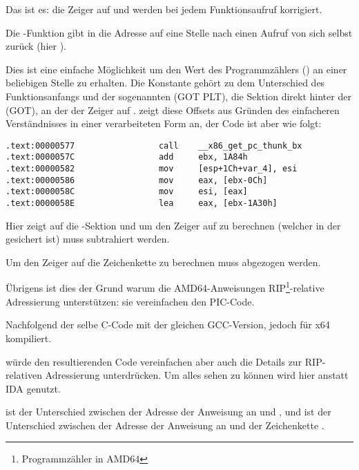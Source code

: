 Das ist es: die Zeiger auf \retstring{} und \globvar{} werden bei jedem Funktionsaufruf korrigiert.

\par Die -Funktion gibt in \EBX die Adresse auf eine Stelle nach einen
Aufruf von sich selbst zurück (hier ).

Dies ist eine einfache Möglichkeit um den Wert des Programmzählers (\EIP) an einer beliebigen Stelle zu erhalten.
Die Konstante  gehört zu dem Unterschied des Funktionsanfangs und der sogenannten
 (GOT PLT), die Sektion direkt hinter der 
(GOT), an der der Zeiger auf \globvar{}.
\IDA zeigt diese Offsets aus Gründen des einfacheren Verständnisses in einer verarbeiteten Form an,
der Code ist aber wie folgt:

\begin{lstlisting}
.text:00000577                 call    __x86_get_pc_thunk_bx
.text:0000057C                 add     ebx, 1A84h
.text:00000582                 mov     [esp+1Ch+var_4], esi
.text:00000586                 mov     eax, [ebx-0Ch]
.text:0000058C                 mov     esi, [eax]
.text:0000058E                 lea     eax, [ebx-1A30h]
\end{lstlisting}

Hier zeigt \EBX auf die -Sektion und um den Zeiger auf \globvar{} zu berechnen
(welcher in der  gesichert ist) muss  subtrahiert werden.

Um den Zeiger auf die Zeichenkette \retstring{} zu berechnen muss  abgezogen werden.


Übrigens ist dies der Grund warum die AMD64-Anweisungen RIP\footnote{Programmzähler in AMD64}-relative Adressierung
unterstützen: sie vereinfachen den PIC-Code.

Nachfolgend der selbe C-Code mit der gleichen GCC-Version, jedoch für x64 kompiliert.

\IDA würde den resultierenden Code vereinfachen aber auch die Details zur RIP-relativen Adressierung
unterdrücken. Um alles sehen zu können wird hier  anstatt IDA genutzt.



 ist der Unterschied zwischen der Adresse der Anweisung an  und \globvar{},
und  ist der Unterschied zwischen der Adresse der Anweisung an  und der
Zeichenkette \retstring{}.


